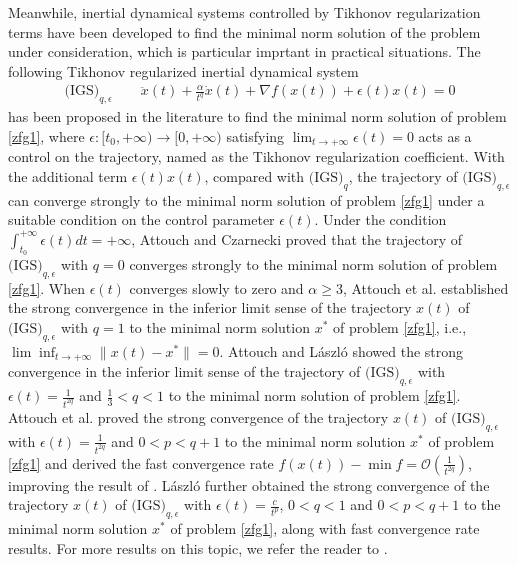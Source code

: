 \documentclass[review]{elsarticle}
\begin{document}
Meanwhile, inertial dynamical systems controlled by Tikhonov regularization  terms have been developed  to  find the minimal norm solution of the problem under consideration, which is particular imprtant in practical situations. The following Tikhonov regularized inertial dynamical system
	\begin{eqnarray*}
		\text{(IGS)}_{q,\epsilon}\quad\quad
		\ddot{x}(t)+\frac{\alpha}{t^{q}} \dot{x}(t)+\nabla f(x(t))+\epsilon(t)x(t)=0
	\end{eqnarray*}
has been proposed in the literature to find  the minimal norm solution of  problem \eqref{zfg1}, where  $\epsilon:[t_0,+\infty)\to[0,+\infty)$ satisfying $\lim_{t\to+\infty}\epsilon(t) =0$  acts as a control on the trajectory, named as the Tikhonov regularization coefficient. With the additional term $\epsilon(t)x(t)$, compared with  $\text{(IGS)}_{q}$, the  trajectory of $\text{(IGS)}_{q,\epsilon}$ can converge strongly to the minimal norm solution of  problem \eqref{zfg1} under a suitable condition on the control parameter $\epsilon(t)$.  Under the condition  $\int_{t_0}^{+\infty}\epsilon(t)dt=+\infty$,  Attouch and Czarnecki \cite{AttouchandCzarnecki(2002)} proved  that  the trajectory of $\text{(IGS)}_{q,\epsilon}$ with $q=0$ converges strongly to the minimal norm solution of problem \eqref{zfg1}.  When $\epsilon(t)$ converges slowly to zero and $\alpha\ge 3$, Attouch et al. \cite{AttouchZH2018} established the strong convergence  in the inferior limit sense of the trajectory $x(t)$ of  $\text{(IGS)}_{q,\epsilon}$ with $q=1$ to  the minimal norm solution $x^*$ of problem \eqref{zfg1}, i.e., $\lim\inf_{t\rightarrow+\infty}\|x(t)-{x}^*\|=0$. Attouch and L{\'a}szl{\'o} \cite{Attouchlaszlo2021} showed  the strong convergence  in the inferior limit sense of the trajectory of $\text{(IGS)}_{q,\epsilon}$ with $\epsilon(t)=\frac{1}{t^{2q}}$ and $\frac{1}{3}<q<1$ to the minimal norm solution of  problem \eqref{zfg1}. Attouch et al. \cite{AttouchBCR2022311}   proved  the strong convergence of the trajectory $x(t)$ of  $\text{(IGS)}_{q,\epsilon}$ with $\epsilon(t)=\frac{1}{t^{2q}}$ and  $0<p<q+1$ to the minimal norm solution $x^*$ of   problem \eqref{zfg1} and derived the fast convergence rate $f(x(t))-\min f=\mathcal{O}\left(\frac{1}{t^{2q}}\right)$,  improving the result of \cite{Attouchlaszlo2021}. L{\'a}szl{\'o} \cite{Laszlo2023} further obtained the strong convergence of the trajectory $x(t)$ of  $\text{(IGS)}_{q,\epsilon}$ with  $\epsilon(t)=\frac{c}{t^{p}}$,  $0<q<1$ and $0<p<q+1$ to the minimal norm solution $x^*$ of  problem \eqref{zfg1}, along with  fast convergence rate results. For more results on this topic, we refer the reader to   \cite{botcsernek2021, Alecsalaszlo2021}.
\end{document}
